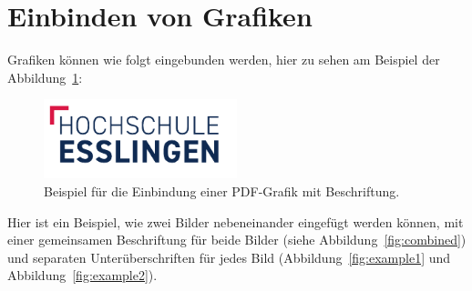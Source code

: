 \section*{Einbinden von Grafiken}

Grafiken können wie folgt eingebunden werden, hier zu sehen am Beispiel der
Abbildung~\ref{fig:example}:

\begin{figure}[htb!]
  \centering
  \includegraphics[width=0.5\textwidth]{figures/hs-esslingen-logo}
  \caption{Beispiel für die Einbindung einer PDF-Grafik mit Beschriftung.}
  \label{fig:example}
\end{figure}

Hier ist ein Beispiel, wie zwei Bilder nebeneinander eingefügt werden können,
mit einer gemeinsamen Beschriftung für beide Bilder (siehe
Abbildung~\ref{fig:combined}) und separaten Unterüberschriften für jedes Bild
(Abbildung~\ref{fig:example1} und Abbildung~\ref{fig:example2}).

